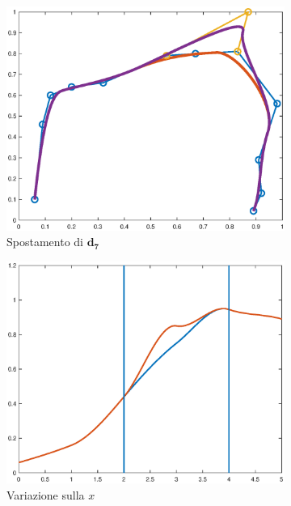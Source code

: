 \documentclass[a4paper, 12pt]{article}
\begin{document}
\begin{figure}[]
  \centering
  \begin{subfigure}[b]{0.3\textwidth}
    \includegraphics[width=\textwidth]{figure/loc3.eps}
    \caption{Spostamento di $\mathbf{d_7}$ }
    \label{fig:loc3}
  \end{subfigure}
  \begin{subfigure}[b]{0.3\textwidth}
      \includegraphics[width=\textwidth]{figure/loc2.eps}
      \caption{Variazione sulla $x$}
      \label{fig:loc2}
  \end{subfigure}
  \begin{subfigure}[b]{0.3\textwidth}

\end{subfigure}
\end{figure}
\end{document}
